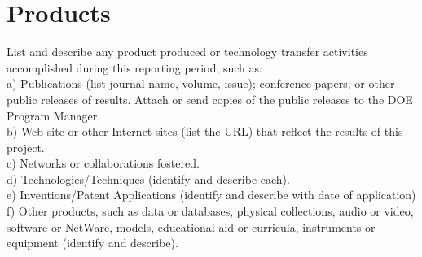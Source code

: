 \documentclass[12pt]{article}
\begin{document}
\section{Products}
\label{sect::products}
List and describe any product produced or technology transfer activities accomplished during this reporting period, such as: \\
a)	Publications (list journal name, volume, issue); conference papers; or other public releases of results.  Attach or send copies of the public releases to the DOE Program Manager. \\
b)	Web site or other Internet sites (list the URL) that reflect the results of this project. \\
c)	Networks or collaborations fostered. \\
d)	Technologies/Techniques (identify and describe each). \\
e)	Inventions/Patent Applications (identify and describe with date of application) \\
f)	Other products, such as data or databases, physical collections, audio or video, software or NetWare, models, educational aid or curricula, instruments or equipment (identify and describe).






\appendix

\makeatletter
\def\@seccntformat#1{APPENDIX \csname the#1\endcsname.~}
\makeatother

%
%
%
\end{document}

